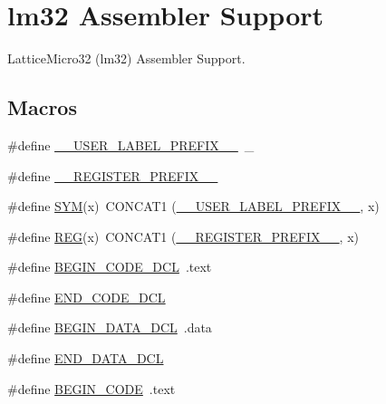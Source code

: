 \hypertarget{group__RTEMSScoreCPUlm32ASM}{}\section{lm32 Assembler Support}
\label{group__RTEMSScoreCPUlm32ASM}


Lattice\+Micro32 (lm32) Assembler Support.  


\subsection*{Macros}
\begin{DoxyCompactItemize}
\item 
\#define \mbox{\hyperlink{group__RTEMSScoreCPUlm32ASM_gaff6bf0ff0fa3b5cbd23a8ae1131c87a9}{\+\_\+\+\_\+\+U\+S\+E\+R\+\_\+\+L\+A\+B\+E\+L\+\_\+\+P\+R\+E\+F\+I\+X\+\_\+\+\_\+}}~\+\_\+
\item 
\#define \mbox{\hyperlink{group__RTEMSScoreCPUlm32ASM_ga08d4062230ffc8494f4be4f6447497e4}{\+\_\+\+\_\+\+R\+E\+G\+I\+S\+T\+E\+R\+\_\+\+P\+R\+E\+F\+I\+X\+\_\+\+\_\+}}
\item 
\#define \mbox{\hyperlink{group__RTEMSScoreCPUlm32ASM_gafe05d428a5f345f51fb591debb815325}{S\+YM}}(x)~C\+O\+N\+C\+A\+T1 (\mbox{\hyperlink{group__RTEMSScoreCPUx86-64ASM_gaff6bf0ff0fa3b5cbd23a8ae1131c87a9}{\+\_\+\+\_\+\+U\+S\+E\+R\+\_\+\+L\+A\+B\+E\+L\+\_\+\+P\+R\+E\+F\+I\+X\+\_\+\+\_\+}}, x)
\item 
\#define \mbox{\hyperlink{group__RTEMSScoreCPUlm32ASM_gacee196421e9a06f7700bb3064b13b37a}{R\+EG}}(x)~C\+O\+N\+C\+A\+T1 (\mbox{\hyperlink{group__RTEMSScoreCPUV850ASM_ga08d4062230ffc8494f4be4f6447497e4}{\+\_\+\+\_\+\+R\+E\+G\+I\+S\+T\+E\+R\+\_\+\+P\+R\+E\+F\+I\+X\+\_\+\+\_\+}}, x)
\item 
\#define \mbox{\hyperlink{group__RTEMSScoreCPUlm32ASM_ga63dd305e6cb437ad2dc29a4184f96fbc}{B\+E\+G\+I\+N\+\_\+\+C\+O\+D\+E\+\_\+\+D\+CL}}~.text
\item 
\#define \mbox{\hyperlink{group__RTEMSScoreCPUlm32ASM_gad7bee6a7cae4ed99b9f83f54afaecec8}{E\+N\+D\+\_\+\+C\+O\+D\+E\+\_\+\+D\+CL}}
\item 
\#define \mbox{\hyperlink{group__RTEMSScoreCPUlm32ASM_ga7f059077f76d2de57e245990dc6fdf25}{B\+E\+G\+I\+N\+\_\+\+D\+A\+T\+A\+\_\+\+D\+CL}}~.data
\item 
\#define \mbox{\hyperlink{group__RTEMSScoreCPUlm32ASM_gaba5951c6a7df52e7c13d07a6823e9758}{E\+N\+D\+\_\+\+D\+A\+T\+A\+\_\+\+D\+CL}}
\item 
\#define \mbox{\hyperlink{group__RTEMSScoreCPUlm32ASM_ga6d6dc213aff5b736968e2aff37eb2c99}{B\+E\+G\+I\+N\+\_\+\+C\+O\+DE}}~.text

\end{DoxyCompactItemize}
